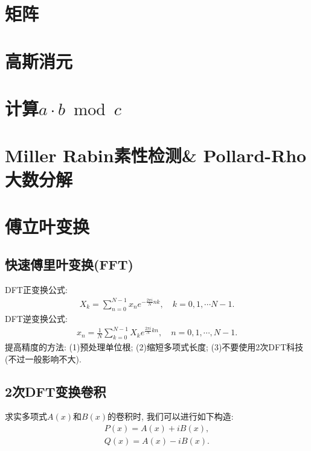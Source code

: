 \section{矩阵}


\section{高斯消元}


\section{计算$a \cdot b \bmod c$}


\section{Miller Rabin素性检测\& Pollard-Rho大数分解}


\section{傅立叶变换}


\subsection{快速傅里叶变换(FFT)}
DFT正变换公式:
\begin{gather*}
    X_k = \sum_{n=0}^{N-1} x_n e^{-\frac{2 \pi i}{N} nk}, \quad k = 0, 1, \cdots N-1.
\end{gather*}
DFT逆变换公式:
\begin{gather*}
    x_n = \frac{1}{N} \sum_{k=0}^{N-1} X_k e^{\frac{2 \pi i}{N} kn}, \quad n = 0,1, \cdots, N-1.
\end{gather*}
提高精度的方法: (1)预处理单位根; (2)缩短多项式⻓度; (3)不要使用2次DFT科技(不过一般影响不大).



\subsection{2次DFT变换卷积}
求实多项式$A(x)$和$B(x)$的卷积时, 我们可以进行如下构造:
\begin{gather*}
    P(x) = A(x) + i B(x), \\
    Q(x) = A(x) - i B(x).
\end{gather*}

